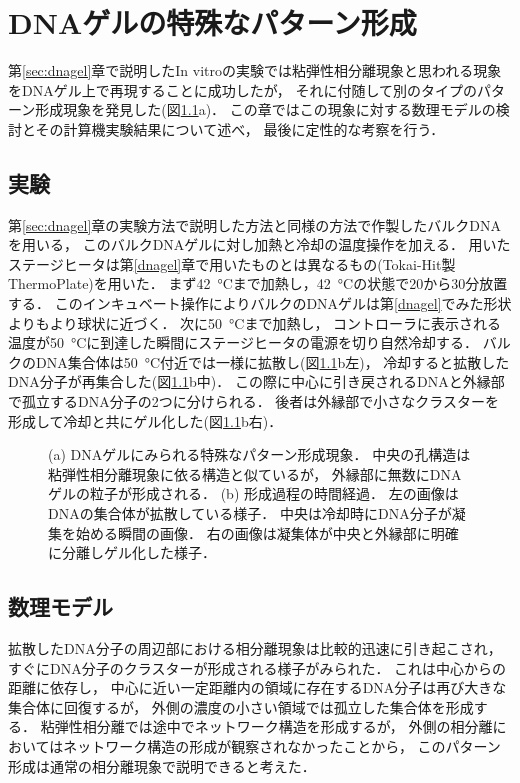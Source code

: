 \chapter{DNAゲルの特殊なパターン形成}

第\ref{sec:dnagel}章で説明したIn vitroの実験では粘弾性相分離現象と思われる現象をDNAゲル上で再現することに成功したが，
それに付随して別のタイプのパターン形成現象を発見した(図\ref{fig:result_special}a)．
この章ではこの現象に対する数理モデルの検討とその計算機実験結果について述べ，
最後に定性的な考察を行う．

\section{実験}
第\ref{sec:dnagel}章の実験方法で説明した方法と同様の方法で作製したバルクDNAを用いる，
このバルクDNAゲルに対し加熱と冷却の温度操作を加える．
用いたステージヒータは第\ref{dnagel}章で用いたものとは異なるもの(Tokai-Hit製ThermoPlate)を用いた．
まず\SI{42}{\celsius}まで加熱し，\SI{42}{\celsius}の状態で20から30分放置する．
このインキュベート操作によりバルクのDNAゲルは第\ref{dnagel}でみた形状よりもより球状に近づく．
次に\SI{50}{\celsius}まで加熱し，
コントローラに表示される温度が\SI{50}{\celsius}に到達した瞬間にステージヒータの電源を切り自然冷却する．
バルクのDNA集合体は\SI{50}{\celsius}付近では一様に拡散し(図\ref{fig:result_special}b左)，
冷却すると拡散したDNA分子が再集合した(図\ref{fig:result_special}b中)．
この際に中心に引き戻されるDNAと外縁部で孤立するDNA分子の2つに分けられる．
後者は外縁部で小さなクラスターを形成して冷却と共にゲル化した(図\ref{fig:result_special}b右)．

\begin{figure}
\centering

\caption{
    (a) DNAゲルにみられる特殊なパターン形成現象．
        中央の孔構造は粘弾性相分離現象に依る構造と似ているが，
        外縁部に無数にDNAゲルの粒子が形成される．
    (b) 形成過程の時間経過．
        左の画像はDNAの集合体が拡散している様子．
        中央は冷却時にDNA分子が凝集を始める瞬間の画像．
        右の画像は凝集体が中央と外縁部に明確に分離しゲル化した様子．
}
\label{fig:result_special}
\end{figure}

\section{数理モデル}
拡散したDNA分子の周辺部における相分離現象は比較的迅速に引き起こされ，
すぐにDNA分子のクラスターが形成される様子がみられた．
これは中心からの距離に依存し，
中心に近い一定距離内の領域に存在するDNA分子は再び大きな集合体に回復するが，
外側の濃度の小さい領域では孤立した集合体を形成する．
粘弾性相分離では途中でネットワーク構造を形成するが，
外側の相分離においてはネットワーク構造の形成が観察されなかったことから，
このパターン形成は通常の相分離現象で説明できると考えた．

